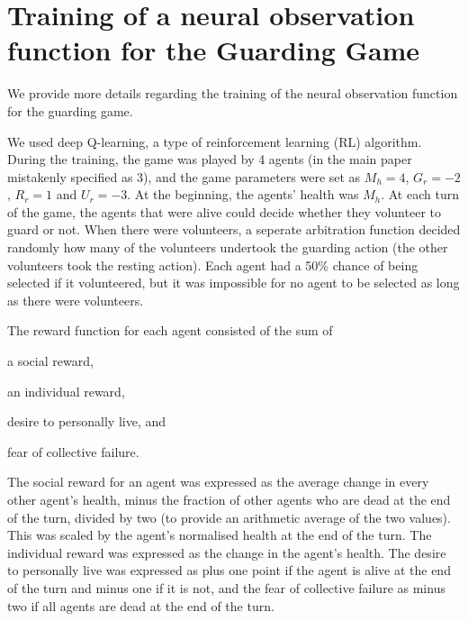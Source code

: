 \documentclass{article}
\begin{document}
\section{Training of a neural observation function for the Guarding Game} 

We provide more details regarding the training of the neural observation
function for the guarding game.

We used deep Q-learning, a type of reinforcement learning (RL) algorithm.
During the training, the game was played by 4 agents (in the main paper
mistakenly specified as 3), and the game parameters were set as $M_h = 4$,
$G_r = -2$, $R_r = 1$ and $U_r = -3$.
%
At the beginning, the agents' health was $M_h$.
%
At each turn of the game, the agents that were alive could decide whether they
volunteer to guard or not. When there were volunteers, a seperate arbitration
function decided randomly how many of the volunteers undertook the guarding
action (the other volunteers took the resting action). Each agent had a 50\%
chance of being selected if it volunteered, but it was impossible for no agent
to be selected as long as there were volunteers.

The reward function for each agent consisted of the sum of
\begin{inparaenum}[\it (i)]
\item  a social reward,
\item an individual reward,
\item desire to personally live, and
\item fear of collective failure.
\end{inparaenum}
The social reward for an agent was expressed as the average change in every
other agent's health, minus the fraction of other agents who are dead at the
end of the turn, divided by two (to provide an arithmetic average of the two
values). This was scaled by the agent's normalised health at the end of the
turn. The individual reward was expressed as the change in the agent's health.
The desire to personally live was expressed as plus one point if the agent is
alive at the end of the turn and minus one if it is not, and the fear of
collective failure as minus two if all agents are dead at the end of the turn.
\end{document}
